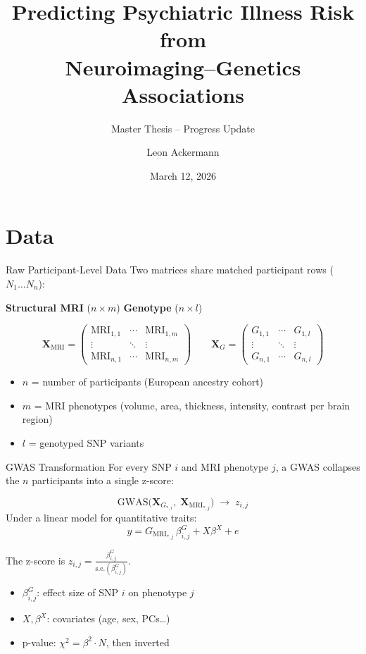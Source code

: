 \documentclass[aspectratio=169, 10pt]{beamer}
\title{Predicting Psychiatric Illness Risk from\\Neuroimaging--Genetics Associations}
\subtitle{Master Thesis -- Progress Update}
\author{Leon Ackermann}
\date{March 12, 2026}
\begin{document}
\maketitle

\section{Data}

\begin{frame}{Raw Participant-Level Data}
Two matrices share matched participant rows ($N_1 \ldots N_n$):

\medskip
\hspace{9em}\textbf{Structural MRI} ($n\times m$) \hspace{6em} \textbf{Genotype} ($n\times l$)

\[
\mathbf{X}_{\text{MRI}} =
\begin{pmatrix}
\text{MRI}_{1,1} & \cdots & \text{MRI}_{1,m}\\
\vdots & \ddots & \vdots\\
\text{MRI}_{n,1} & \cdots & \text{MRI}_{n,m}
\end{pmatrix}
\qquad
\mathbf{X}_{G} =
\begin{pmatrix}
G_{1,1} & \cdots & G_{1,l}\\
\vdots & \ddots & \vdots\\
G_{n,1} & \cdots & G_{n,l}
\end{pmatrix}
\]

\begin{itemize}
    \item $n$ = number of participants (European ancestry cohort)
    \item $m$ = MRI phenotypes (volume, area, thickness, intensity, contrast per brain region)
    \item $l$ = genotyped SNP variants
\end{itemize}
\end{frame}

\begin{frame}{GWAS Transformation}
For every SNP $i$ and MRI phenotype $j$, a GWAS collapses the $n$ participants into a single z-score:

\[
\text{GWAS}\!\bigl(\mathbf{X}_{G_{*,i}},\;\mathbf{X}_{\text{MRI}_{*,j}}\bigr)
\;\longrightarrow\; z_{i,j}
\]
Under a linear model for quantitative traits:
\[
y = G_{\text{MRI}_{*,j}}\,\beta^{G}_{i,j} + X\beta^{X} + e
\]

The z-score is
$\displaystyle z_{i,j} = \frac{\beta^{G}_{i,j}}{\mathrm{s.e.}(\beta^{G}_{i,j})}$.

\medskip
\begin{itemize}
    \item $\beta^{G}_{i,j}$: effect size of SNP $i$ on phenotype $j$
    \item $X,\beta^{X}$: covariates (age, sex, PCs\ldots)
    \item p-value: $\chi^{2} = \beta^{2}\cdot N$, then inverted
\end{itemize}
\end{frame}
\end{document}
